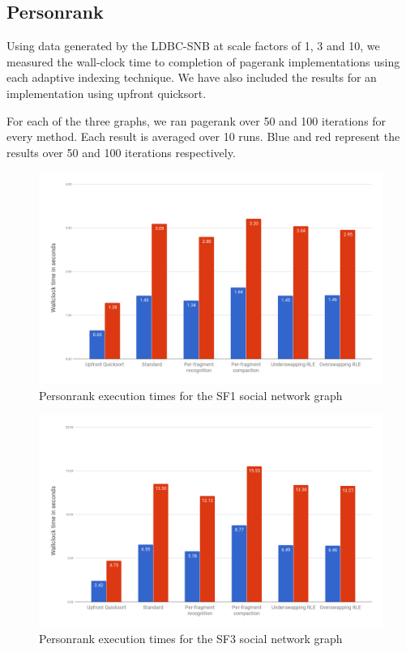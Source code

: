 \subsection{Personrank}

Using data generated by the LDBC-SNB at scale factors of 1, 3 and 10, we measured the wall-clock time to completion of pagerank implementations using each adaptive indexing technique. We have also included the results for an implementation using upfront quicksort.

For each of the three graphs, we ran pagerank over 50 and 100 iterations for every method. Each result is averaged over 10 runs. Blue and red represent the results over 50 and 100 iterations respectively.

\begin{figure}[H]
  \centering
  \includegraphics[width=\textwidth]{images/personrankSF1}
  \caption{Personrank execution times for the SF1 social network graph}
  \label{fig:personranksf1}
\end{figure}

\begin{figure}[H]
  \centering
  \includegraphics[width=\textwidth]{images/personrankSF3}
  \caption{Personrank execution times for the SF3 social network graph}
  \label{fig:personranksf3}
\end{figure}

